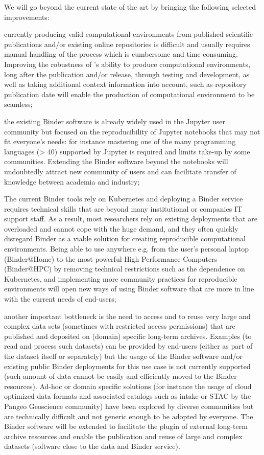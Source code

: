 We will go beyond the current state of the art by bringing the following selected improvements:
\begin{compactitem}
\item currently producing valid computational environments from published scientific publications and/or existing online repositories is difficult and usually requires manual handling of the process which is cumbersome and time consuming. Improving the robustness of \repotodocker{}'s ability to produce computational environments, long after the publication and/or release,
      through testing and development, as well as taking additional context information into account, such as repository publication date will enable the production of computational environment to be seamless;
\item the existing Binder software is already widely used in the Jupyter user community but focused on the reproducibility of Jupyter notebooks that may not fit everyone’s needs: for instance mastering one of the many programming languages (> 40) supported by Jupyter is required and limits take-up by some communities. Extending the Binder software beyond the notebooks will undoubtedly attract new community of users and can facilitate transfer of knowledge between academia and industry;
\item The current Binder tools rely on Kubernetes and deploying a Binder service requires technical skills that are beyond many institutional or companies IT support staff. As a result, most researchers rely on existing deployments that are overloaded and cannot cope with the huge demand, and they often quickly disregard Binder as a viable solution for creating reproducible computational environments. Being able to use \repotodocker{} anywhere e.g. from the user’s personal laptop (Binder@Home) to the most powerful High Performance Computers (Binder@HPC) by removing technical restrictions such as the dependence on Kubernetes, and implementing more community practices for reproducible environments will open new ways of using Binder software that are more in line with the current needs of end-users;
\item another important bottleneck is the need to access and to reuse very large and complex data sets (sometimes with restricted access permissions) that are published and deposited on (domain) specific long-term archives. Examples (to read and process such datasets) can be provided by end-users (either as part of the dataset itself or separately) but the usage of the Binder software and/or existing public Binder deployments for this use case is not currently supported (such amount of data cannot be easily and efficiently moved to the Binder resources). Ad-hoc or domain specific solutions (for instance the usage of cloud optimized data formats and associated catalogs such as intake or STAC by the Pangeo Geoscience community) have been explored by diverse communities but are technically difficult and not generic enough to be adopted by everyone. The Binder software will be extended to facilitate the plugin of external long-term archive resources and enable the publication and reuse of large and complex datasets (software close to the data and Binder service).
\end{compactitem}


